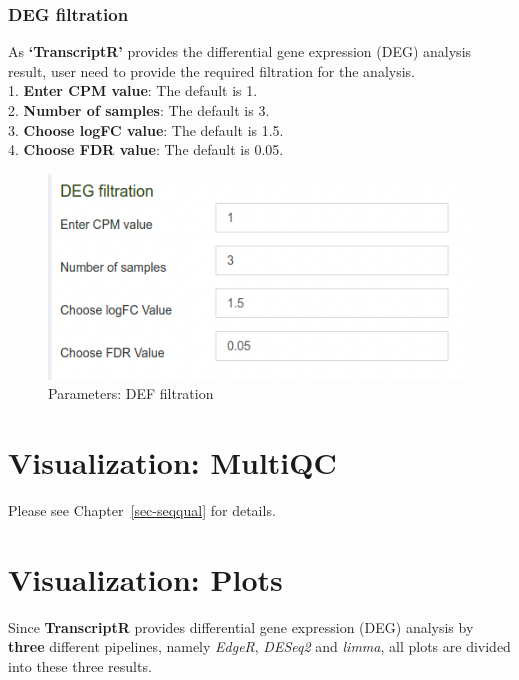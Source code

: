 \documentclass[
  a4paper,
  oneside,
  open=any]{scrreport}
\begin{document}
\hypertarget{deg-filtration}{%
\subsubsection{DEG filtration}\label{deg-filtration}}

As \textbf{`TranscriptR'} provides the differential gene expression
(DEG) analysis result, user need to provide the required filtration for
the analysis.\\
1. \textbf{Enter CPM value}: The default is 1.\\
2. \textbf{Number of samples}: The default is 3.\\
3. \textbf{Choose logFC value}: The default is 1.5.\\
4. \textbf{Choose FDR value}: The default is 0.05.

\begin{figure}[H]

{\centering \includegraphics{./images/transcriptome/transcript7.png}

}

\caption{\label{fig-trans6}Parameters: DEF filtration}

\end{figure}

\hypertarget{visualization-multiqc}{%
\section{Visualization: MultiQC}\label{visualization-multiqc}}

Please see Chapter~\ref{sec-seqqual} for details.

\hypertarget{visualization-plots}{%
\section{Visualization: Plots}\label{visualization-plots}}

Since \textbf{TranscriptR} provides differential gene expression (DEG)
analysis by \textbf{three} different pipelines, namely \emph{EdgeR},
\emph{DESeq2} and \emph{limma}, all plots are divided into these three
results.
\end{document}
